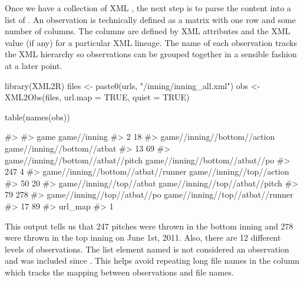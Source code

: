 \begin{article}
Once we have a collection of XML , the next step is to
parse the content into a list of . An observation
is technically defined as a matrix with one row and some number of
columns. The columns are defined by XML attributes and the XML value
(if any) for a particular XML lineage. The name of each observation
tracks the XML hierarchy so observations can be grouped together in
a sensible fashion at a later point.
%
\begin{Schunk}
\begin{Sinput}
library(XML2R)
files <- paste0(urls, "/inning/inning_all.xml")
obs <- XML2Obs(files, url.map = TRUE, quiet = TRUE) 
\end{Sinput}
\end{Schunk}
%
\vspace{-.45cm}
%
\begin{Schunk}
\begin{Sinput}
table(names(obs))
\end{Sinput}
\begin{Soutput}
#> 
#>                                game                        game//inning 
#>                                   2                                  18 
#>        game//inning//bottom//action         game//inning//bottom//atbat 
#>                                  13                                  69 
#>  game//inning//bottom//atbat//pitch     game//inning//bottom//atbat//po 
#>                                 247                                   4 
#> game//inning//bottom//atbat//runner           game//inning//top//action 
#>                                  50                                  20 
#>            game//inning//top//atbat     game//inning//top//atbat//pitch 
#>                                  79                                 278 
#>        game//inning//top//atbat//po    game//inning//top//atbat//runner 
#>                                  17                                  89 
#>                             url_map 
#>                                   1
\end{Soutput}
\end{Schunk}
%
This output tells us that 247
pitches were thrown in the bottom inning and 278
were thrown in the top inning on June 1st, 2011. Also, there are 12
different levels of observations. The list element named 
is not considered an observation and was included since .
This helps avoid repeating long file names in the 
column which tracks the mapping between observations and file names. 

\end{article}
